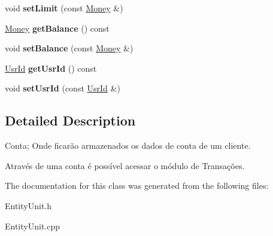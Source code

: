 \begin{DoxyCompactItemize}
\item 
\hypertarget{classAccount_ada9bd7d0aee82d5b6c8f9831eb6fd8d5}{void {\bfseries set\-Limit} (const \hyperlink{classMoney}{Money} \&)}\label{classAccount_ada9bd7d0aee82d5b6c8f9831eb6fd8d5}

\item 
\hypertarget{classAccount_af9414bc748bf1923b2308544bbfd8b82}{\hyperlink{classMoney}{Money} {\bfseries get\-Balance} () const }\label{classAccount_af9414bc748bf1923b2308544bbfd8b82}

\item 
\hypertarget{classAccount_a0c54b27c54fd64b93d31aecdf7f3f302}{void {\bfseries set\-Balance} (const \hyperlink{classMoney}{Money} \&)}\label{classAccount_a0c54b27c54fd64b93d31aecdf7f3f302}

\item 
\hypertarget{classAccount_a59a83e5c5142f79402e79a8d42b36aed}{\hyperlink{classUsrId}{Usr\-Id} {\bfseries get\-Usr\-Id} () const }\label{classAccount_a59a83e5c5142f79402e79a8d42b36aed}

\item 
\hypertarget{classAccount_a97146ede9747001294bcd41c74abd67a}{void {\bfseries set\-Usr\-Id} (const \hyperlink{classUsrId}{Usr\-Id} \&)}\label{classAccount_a97146ede9747001294bcd41c74abd67a}

\end{DoxyCompactItemize}


\subsection{Detailed Description}
Conta; Onde ficarão armazenados os dados de conta de um cliente. 

Através de uma conta é possível acessar o módulo de Transações. 

The documentation for this class was generated from the following files\-:\begin{DoxyCompactItemize}
\item 
Entity\-Unit.\-h\item 
Entity\-Unit.\-cpp\end{DoxyCompactItemize}
